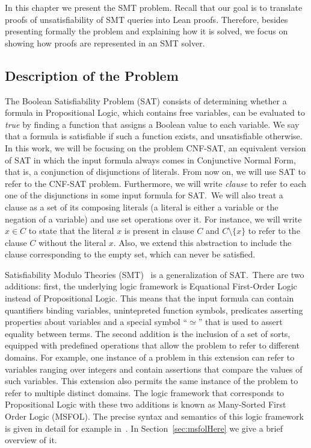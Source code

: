 In this chapter we present the SMT problem. Recall that our goal is to translate proofs of unsatisfiability of SMT queries into Lean proofs. Therefore, besides presenting formally the problem and explaining how it is solved, we focus on showing how proofs are represented in an SMT solver.

\subsection{Description of the Problem}

The Boolean Satisfiability Problem (SAT) consists of determining whether a formula in Propositional Logic, which contains free variables, can be evaluated to \textit{true} by finding a function that assigns a Boolean value to each variable.
We say that a formula is satisfiable if such a function exists, and unsatisfiable otherwise. In
this work, we will be focusing on the problem CNF-SAT, an equivalent version of SAT in
which the input formula always comes in Conjunctive Normal Form, that is, a conjunction
of disjunctions of literals. From now on, we will use SAT to refer to the CNF-SAT problem. Furthermore, we will write \textit{clause} to refer to each one of the disjunctions in some
input formula for SAT.\ We will also treat a clause as a set of its composing literals (a literal is either a variable or the negation of a variable) and use set operations over it. For instance, we will write $x \in C$ to state that the literal $x$ is present in clause $C$ and $C \setminus \{x\}$ to refer to the clause $C$ without the literal $x$. Also, we extend this abstraction to include the
clause corresponding to the empty set, which can never be satisfied.


Satisfiability Modulo Theories (SMT)~\cite[ch. 33]{handbook} is a generalization of SAT.\
There are two additions: first, the underlying logic framework is Equational First-Order
Logic instead of Propositional Logic. This means that the input formula
can contain quantifiers binding variables, unintepreted function symbols,
predicates asserting properties about variables and a special symbol ``$\simeq$'' that is used to assert equality between terms.
The second addition is the inclusion of a set of sorts, equipped with predefined
operations that allow the problem to refer to different domains.
For example, one instance of a problem in this extension can refer to variables
ranging over integers and contain assertions that compare the values of such variables.
This extension also permits the same instance of the problem to refer to multiple
distinct domains.
The logic framework that corresponds to Propositional Logic with these two additions is
known as Many-Sorted First Order Logic (MSFOL). The precise syntax and semantics of this
logic framework is given in detail for example in~\cite{many_sorted}. In
Section~\ref{sec:msfolHere} we give a brief overview of it.


